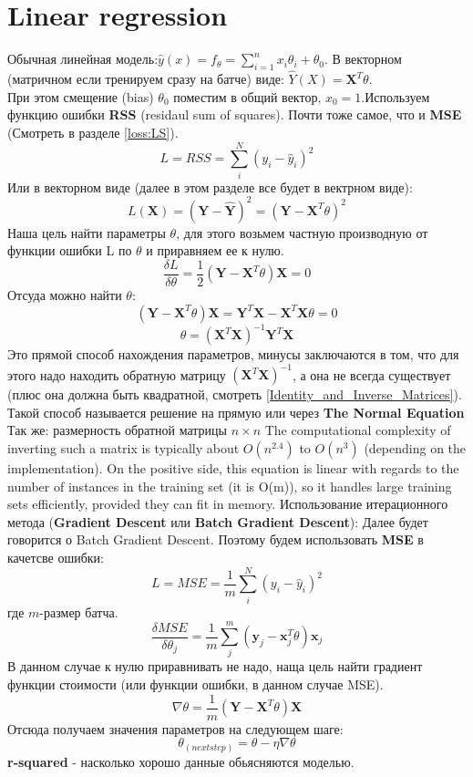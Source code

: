 \documentclass{book}
\begin{document}
\chapter{Linear regression}
Обычная линейная модель:$ \hat y(x) = f_\theta = \sum_{i=1}^{n}x_i\theta_i + \theta_0$. В векторном (матричном если тренируем сразу на батче) виде: $\hat Y(X) = \mathbf{X}^T\theta$.\\При этом смещение (bias) $\theta_0$ поместим в общий вектор, $x_0=1$.Используем функцию ошибки \textbf{RSS} (residaul sum of squares). Почти тоже самое, что и \textbf{MSE} (Смотреть в разделе \autoref{loss:LS}).$$L=RSS=\sum_i^N{(y_i-\hat y_i)^2}$$Или в векторном виде (далее в этом разделе все будет в вектрном виде):$$L(\mathbf{X})=(\mathbf{Y}-\hat{\mathbf{Y}})^2=(\mathbf{Y}-\mathbf{X}^T\theta)^2$$Наша цель найти параметры $\theta$, для этого возьмем частную производную от функции ошибки L по $\theta$ и приравняем ее к нулю.$$\frac{\delta L}{\delta \theta}=\frac{1}{2}(\mathbf{Y} - \mathbf{X}^T\theta)\mathbf{X}=0$$Отсуда можно найти $\theta$:$$(\mathbf{Y} - \mathbf{X}^T\theta)\mathbf{X}=\mathbf{Y}^T\mathbf{X}-\mathbf{X}^T\mathbf{X}\theta = 0$$ $$\theta=(\mathbf{X}^T\mathbf{X})^{-1}\mathbf{Y}^T\mathbf{X}$$Это прямой способ нахождения параметров, минусы заключаются в том, что для этого надо находить обратную матрицу $(\mathbf{X}^T\mathbf{X})^{-1}$, а она не всегда существует (плюс она должна быть квадратной, смотреть \autoref{Identity_and_Inverse_Matrices}). Такой способ называется решение на прямую или через \textbf{The Normal Equation} Так же: размерность обратной матрицы $n\times n$ The computational complexity of inverting such a matrix is typically about $O(n^2.4)$ to $O(n^3)$ (depending on the implementation). On the positive side, this equation is linear with regards to the number of instances in the training set (it is
O(m)), so it handles large training sets efficiently, provided they can fit in memory.
Использование итерационного метода (\textbf{Gradient Descent} или \textbf{Batch Gradient Descent}): Далее будет говорится о Batch Gradient Descent. Поэтому будем использовать \textbf{MSE} в качетсве ошибки:$$L=MSE=\frac{1}{m}\sum_i^N{(y_i-\hat y_i)^2}$$где $m$-размер батча.$$\frac{\delta MSE}{\delta \theta_j}=\frac{1}{m}\sum_j^m(\mathbf{y}_j - \mathbf{x}_j^T\theta)\mathbf{x}_j$$В данном случае к нулю приравнивать не надо, наща цель найти градиент функции стоимости (или функции ошибки, в данном случае MSE).$$\nabla \theta = \frac{1}{m}(\mathbf{Y} - \mathbf{X}^T\theta)\mathbf{X}$$Отсюда получаем значения параметров на следующем шаге: $$\theta_{(next step)}=\theta-\eta\nabla\theta$$
\textbf{r-squared}  - насколько хорошо данные обьясняются моделью.
\end{document}
